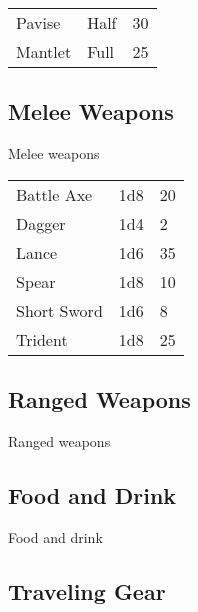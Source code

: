 \begin{multicols}{2}
\begin{center}
\begin{xtabular}{|l|l|l|}
Pavise & Half & 30 \\
Mantlet & Full & 25 \\
\hline
\end{xtabular}
\end{center}

\subsection{Melee Weapons}

Melee weapons

\begin{center}
\begin{xtabular}{|l|l|l|}
Battle Axe & 1d8 & 20 \\
Dagger & 1d4 & 2 \\
Lance & 1d6 & 35 \\
Spear & 1d8 & 10 \\
Short Sword & 1d6 & 8 \\
Trident & 1d8 & 25 \\
\hline
\end{xtabular}
\end{center}

\subsection{Ranged Weapons}

Ranged weapons

\subsection{Food and Drink}

Food and drink

\subsection{Traveling Gear}


\end{multicols}
